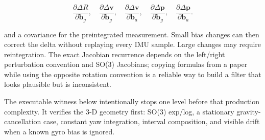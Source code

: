 \[
\frac{\partial\Delta R}{\partial\mathbf b_g},\quad
\frac{\partial\Delta\mathbf v}{\partial\mathbf b_g},\quad
\frac{\partial\Delta\mathbf v}{\partial\mathbf b_a},\quad
\frac{\partial\Delta\mathbf p}{\partial\mathbf b_g},\quad
\frac{\partial\Delta\mathbf p}{\partial\mathbf b_a}.
\]

and a covariance for the preintegrated measurement. Small bias changes can then correct the delta without replaying every IMU sample. Large changes may require reintegration. The exact Jacobian recurrence depends on the left/right perturbation convention and SO(3) Jacobians; copying formulas from a paper while using the opposite rotation convention is a reliable way to build a filter that looks plausible but is inconsistent.

The executable witness below intentionally stops one level before that production complexity. It verifies the 3-D geometry first: SO(3) exp/log, a stationary gravity-cancellation case, constant yaw integration, interval composition, and visible drift when a known gyro bias is ignored.

